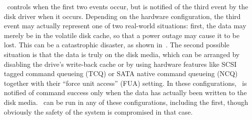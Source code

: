 \Kudos\ controls when the first two events occur, but is notified of the third
event by the disk driver when it occurs. Depending on the hardware
configuration, the third event may actually represent one of two real-world
situations: first, the data may merely be in the volatile disk cache, so that a
power outage may cause it to be lost. This can be a catastrophic disaster, as
shown in~\cite{nightingale06rethink}. The second possible situation is that the
data is truly on the disk media, which can be arranged by disabling the drive's
write-back cache or by using hardware features like SCSI tagged command queueing
(TCQ) or SATA native command queueing (NCQ) together with their ``force unit
access'' (FUA) setting. In these configurations, \Kudos\ is notified of command
success only when the data has actually been written to the disk media. \Kudos\
can be run in any of these configurations, including the first, though obviously
the safety of the system is compromised in that case.
